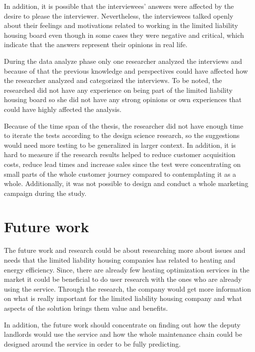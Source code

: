 In addition, it is possible that the interviewees' answers were affected by the desire to please the interviewer. Nevertheless, the interviewees talked openly about their feelings and motivations related to working in the limited liability housing board even though in some cases they were negative and critical, which indicate that the answers represent their opinions in real life. 

During the data analyze phase only one researcher analyzed the interviews and because of that the previous knowledge and perspectives could have affected how the researcher analyzed and categorized the interviews. To be noted, the researched did not have any experience on being part of the limited liability housing board so she did not have any strong opinions or own experiences that could have highly affected the analysis.

Because of the time span of the thesis, the researcher did not have enough time to iterate the tests according to the design science research, so the suggestions would need more testing to be generalized in larger context. In addition, it is hard to measure if the research results helped to reduce customer acquisition costs, reduce lead times and increase sales since the test were concentrating on small parts of the whole customer journey compared to contemplating it as a whole. Additionally, it was not possible to design and conduct a whole marketing campaign during the study.

\section{Future work}

The future work and research could be about researching more about issues and needs that the limited liability housing companies has related to heating and energy efficiency. Since, there are already few heating optimization services in the market it could be beneficial to do user research with the ones who are already using the service. Through the research, the company would get more information on what is really important for the limited liability housing company and what aspects of the solution brings them value and benefits.

In addition, the future work should concentrate on finding out how the deputy landlords would use the service and how the whole maintenance chain could be designed around the service in order to be fully predicting.